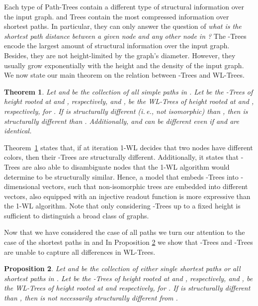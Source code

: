 \documentclass{article}
\theoremstyle{plain}
\newtheorem{theorem}{Theorem}[section]
\newtheorem{proposition}[theorem]{Proposition}
\theoremstyle{definition}
\theoremstyle{remark}
\newcommand{\ie}{i.\,e., }
\begin{document}
Each type of Path-Trees contain a different type of structural information over the input graph.
 and  Trees contain the most compressed information over shortest paths.
In particular, they can only answer the question of \textit{what is the shortest path distance between a given node and any other node in ?} 
The -Trees encode the largest amount of structural information over the input graph. 
Besides, they are not height-limited by the graph's diameter.
However, they usually grow exponentially with the height  and the density of the input graph.
We now state our main theorem on the relation between -Trees and WL-Trees.
\begin{theorem}
\label{theorem:simple_paths_wl}
    Let  and  be the collection of all simple paths in .
    Let  be the -Trees of height  rooted at  and , respectively, and ,  be the WL-Trees of height  rooted at  and , respectively, for . If  is structurally different (\ie not isomorphic) than , then  is structurally different than .
    Additionally,  and  can be different even if  and  are identical.  
\end{theorem}

Theorem~\ref{theorem:simple_paths_wl} states that, if at iteration  1-WL decides that two nodes have different colors, then their -Trees are structurally different.
Additionally, it states that -Trees are also able to disambiguate nodes that the 1-WL algorithm would determine to be structurally similar.
Hence, a model  that embeds -Trees into -dimensional vectors, such that non-isomorphic trees are embedded into different vectors, also equipped with an injective readout function is more expressive than the 1-WL algorithm.
Note that only considering -Trees up to a fixed height  is sufficient to distinguish a broad class of graphs. 

Now that we have considered the case of all paths  we turn our attention to the case of the shortest paths in  and 
In Proposition \ref{prop:SP_example} we show that -Trees and -Trees are unable to capture all differences in WL-Trees. 

\begin{proposition}
    \label{prop:SP_example}
    Let  and  be the collection of either single shortest paths  or all shortest paths  in . Let  be the -Trees of height  rooted at  and , respectively, and ,  be the WL-Trees of height  rooted at  and  respectively, for . If  is structurally different than , then  is not necessarily structurally different from .
\end{proposition}
\end{document}
